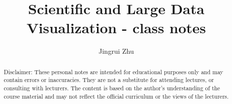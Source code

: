 
%



\title{Scientific and Large Data Visualization - class notes}
\author{Jingrui Zhu}
\date{}

\maketitle

\begin{abstract}
    Disclaimer: These personal notes are intended for educational purposes only and may contain errors or inaccuracies. 
    They are not a substitute for attending lectures, or consulting with lecturers. 
    The content is based on the author's understanding of the course material and may not reflect the official curriculum or the views of the lecturers. 
\end{abstract}

\tableofcontents 
{} 

























